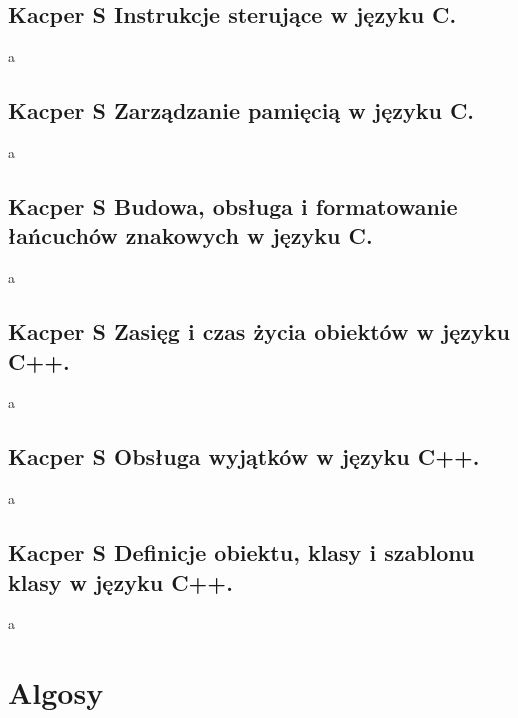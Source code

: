 \documentclass[a4paper,12pt,oneside]{book}
\begin{document}
			\subsection{\color{green} Kacper S \color{red}Instrukcje sterujące w języku C.}
				a
			\newpage\subsection{\color{green} Kacper S \color{red}Zarządzanie pamięcią w języku C.}
				a
			\newpage\subsection{\color{green} Kacper S \color{red}Budowa, obsługa i formatowanie łańcuchów znakowych w języku C.}
				a
			\newpage\subsection{\color{green} Kacper S \color{red}Zasięg i czas życia obiektów w języku C++.}
				a
			\newpage\subsection{\color{green} Kacper S \color{red}Obsługa wyjątków w języku C++.}
				a
			\newpage\subsection{\color{green} Kacper S \color{red}Definicje obiektu, klasy i szablonu klasy w języku C++.}
				a
		
		\newpage\section{Algosy}
\end{document}
